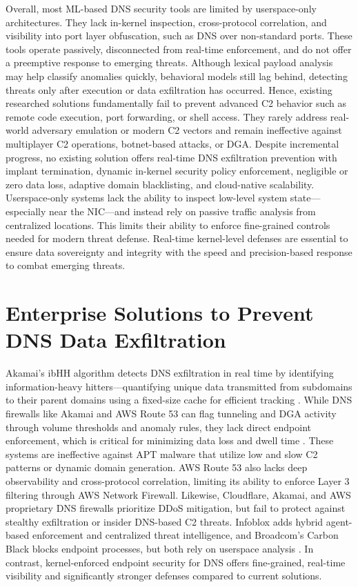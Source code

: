 \documentclass [11pt, proquest] {uwthesis}[2020/02/24]
\begin{document}
Overall, most ML-based DNS security tools are limited by userspace-only architectures. They lack in-kernel inspection, cross-protocol correlation, and visibility into port layer obfuscation, such as DNS over non-standard ports. These tools operate passively, disconnected from real-time enforcement, and do not offer a preemptive response to emerging threats. Although lexical payload analysis may help classify anomalies quickly, behavioral models still lag behind, detecting threats only after execution or data exfiltration has occurred. Hence, existing researched solutions fundamentally fail to prevent advanced C2 behavior such as remote code execution, port forwarding, or shell access. They rarely address real-world adversary emulation or modern C2 vectors and remain ineffective against multiplayer C2 operations, botnet-based attacks, or DGA. Despite incremental progress, no existing solution offers real-time DNS exfiltration prevention with implant termination, dynamic in-kernel security policy enforcement, negligible or zero data loss, adaptive domain blacklisting, and cloud-native scalability. Userspace-only systems lack the ability to inspect low-level system state—especially near the NIC—and instead rely on passive traffic analysis from centralized locations. This limits their ability to enforce fine-grained controls needed for modern threat defense. Real-time kernel-level defenses are essential to ensure data sovereignty and integrity with the speed and precision-based response to combat emerging threats.

\section{Enterprise Solutions to Prevent DNS Data Exfiltration}
Akamai’s ibHH algorithm detects DNS exfiltration in real time by identifying information-heavy hitters—quantifying unique data transmitted from subdomains to their parent domains using a fixed-size cache for efficient tracking \cite{ozery2023information}. While DNS firewalls like Akamai and AWS Route 53 can flag tunneling and DGA activity through volume thresholds and anomaly rules, they lack direct endpoint enforcement, which is critical for minimizing data loss and dwell time \cite{ansari2020reinforcing}. These systems are ineffective against APT malware that utilize low and slow C2 patterns or dynamic domain generation. AWS Route 53 also lacks deep observability and cross-protocol correlation, limiting its ability to enforce Layer 3 filtering through AWS Network Firewall. Likewise, Cloudflare, Akamai, and AWS proprietary DNS firewalls prioritize DDoS mitigation, but fail to protect against stealthy exfiltration or insider DNS-based C2 threats. Infoblox adds hybrid agent-based enforcement and centralized threat intelligence, and Broadcom’s Carbon Black blocks endpoint processes, but both rely on userspace analysis \cite{ahmed2019monitoring}. In contrast, kernel-enforced endpoint security for DNS offers fine-grained, real-time visibility and significantly stronger defenses compared to current solutions.
\end{document}
